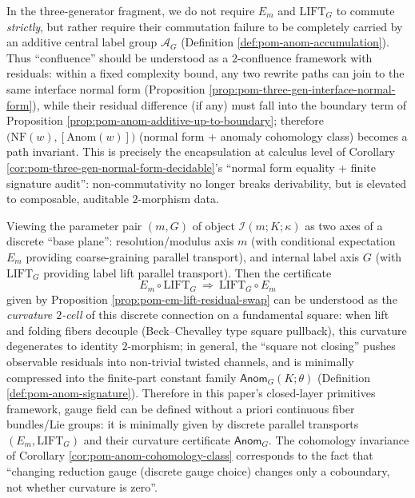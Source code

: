 \begin{remark}\label{rem:pom-residual-2confluence}
In the three-generator fragment, we do not require \(E_m\) and \(\mathrm{LIFT}_G\) to commute \emph{strictly}, but rather require their commutation failure to be completely carried by an additive central label group \(\mathcal{A}_G\) (Definition \ref{def:pom-anom-accumulation}).
Thus ``confluence'' should be understood as a \(2\)-confluence framework with residuals: within a fixed complexity bound, any two rewrite paths can join to the same interface normal form (Proposition \ref{prop:pom-three-gen-interface-normal-form}), while their residual difference (if any) must fall into the boundary term of Proposition \ref{prop:pom-anom-additive-up-to-boundary}; therefore \(\bigl(\mathrm{NF}(w),[\mathrm{Anom}(w)]\bigr)\) (normal form + anomaly cohomology class) becomes a path invariant.
This is precisely the encapsulation at calculus level of Corollary \ref{cor:pom-three-gen-normal-form-decidable}'s ``normal form equality + finite signature audit'': non-commutativity no longer breaks derivability, but is elevated to composable, auditable \(2\)-morphism data.
\end{remark}

\begin{remark}\label{rem:pom-anom-as-curvature}
Viewing the parameter pair \((m,G)\) of object \(\mathcal{I}(m;K;\kappa)\) as two axes of a discrete ``base plane'':
resolution/modulus axis \(m\) (with conditional expectation \(E_m\) providing coarse-graining parallel transport), and internal label axis \(G\) (with \(\mathrm{LIFT}_G\) providing label lift parallel transport).
Then the certificate
\[
E_m\circ \mathrm{LIFT}_G\ \Rightarrow\ \mathrm{LIFT}_G\circ E_m
\]
given by Proposition \ref{prop:pom-em-lift-residual-swap}
can be understood as the \emph{curvature \(2\)-cell} of this discrete connection on a fundamental square:
when lift and folding fibers decouple (Beck--Chevalley type square pullback), this curvature degenerates to identity \(2\)-morphism; in general, the ``square not closing'' pushes observable residuals into non-trivial twisted channels, and is minimally compressed into the finite-part constant family \(\mathsf{Anom}_G(K;\theta)\) (Definition \ref{def:pom-anom-signature}).
Therefore in this paper's closed-layer primitives framework, gauge field can be defined without a priori continuous fiber bundles/Lie groups: it is minimally given by discrete parallel transports \((E_m,\mathrm{LIFT}_G)\) and their curvature certificate \(\mathsf{Anom}_G\).
The cohomology invariance of Corollary \ref{cor:pom-anom-cohomology-class} corresponds to the fact that ``changing reduction gauge (discrete gauge choice) changes only a coboundary, not whether curvature is zero''.
\end{remark}

